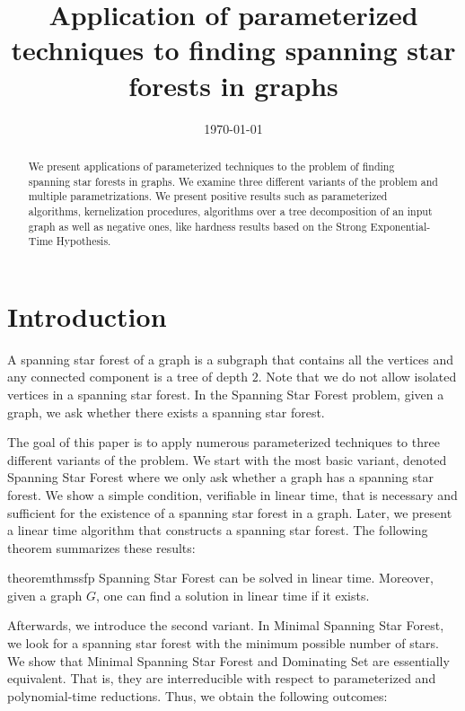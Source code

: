 \documentclass[en]{pracamgr}
\title{Application of parameterized techniques to finding spanning star forests in graphs}
\date{\monthyeardate\today}
\theoremstyle{definition}
\newcommand{\ssfp}{{\sc Spanning Star Forest}}
\newcommand{\mssfp}{{\sc Minimal Spanning Star Forest}}
\newcommand{\domsetp}{{\sc Dominating Set}}
\begin{document}
\maketitle

\begin{abstract}
	We present applications of parameterized techniques to the problem of finding spanning star forests in graphs. We examine three different variants of the problem and multiple parametrizations. We present positive results such as parameterized algorithms, kernelization procedures, algorithms over a tree decomposition of an input graph as well as negative ones, like hardness results based on the Strong Exponential-Time Hypothesis.
\end{abstract}

\tableofcontents

\chapter{Introduction}

A spanning star forest of a graph is a subgraph that contains all the vertices and any connected component is a tree of depth $2$. Note that we do not allow isolated vertices in a spanning star forest. In the \ssfp{} problem, given a graph, we ask whether there exists a spanning star forest. 

The goal of this paper is to apply numerous parameterized techniques to three different variants of the problem. We start with the most basic variant, denoted \ssfp{} where we only ask whether a graph has a spanning star forest. We show a simple condition, verifiable in linear time, that is necessary and sufficient for the existence of a spanning star forest in a graph. Later, we present a linear time algorithm that constructs a spanning star forest. The following theorem summarizes these results:

\begin{restatable}{theorem}{thmssfp}\label{thm-ssfp}
	\ssfp{} can be solved in linear time. Moreover, given a graph $G$, one can find a solution in linear time if it exists.
\end{restatable}

Afterwards, we introduce the second variant. In \mssfp{}, we look for a spanning star forest with the minimum possible number of stars. We show that \mssfp{} and \domsetp{} are essentially equivalent. That is, they are interreducible with respect to parameterized and polynomial-time reductions. Thus, we obtain the following outcomes:
\end{document}
